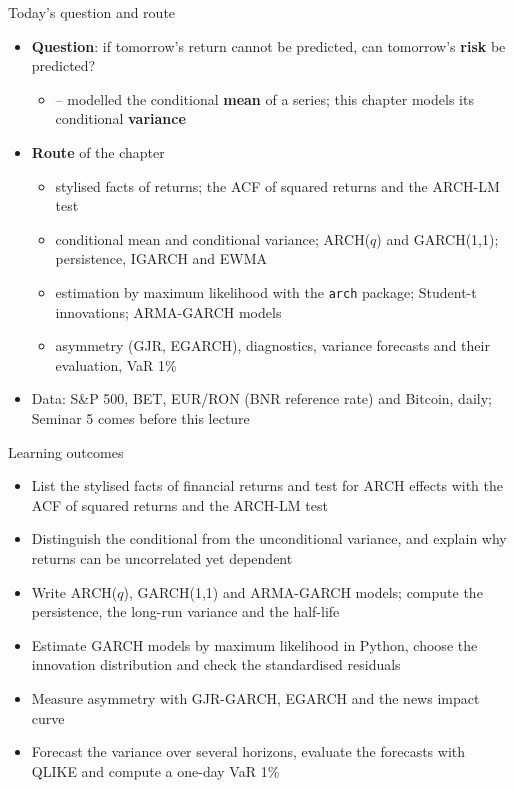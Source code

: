 \begin{frame}{Today's question and route}
\itemsize{\small}
\begin{itemize}
    \item \textbf{Question}: if tomorrow's return cannot be predicted, can tomorrow's \textbf{risk} be predicted?
    \begin{itemize}
        \item {}-- modelled the conditional \textbf{mean} of a series; this chapter models its conditional \textbf{variance}
    \end{itemize}
    \item \textbf{Route} of the chapter
    \begin{itemize}
        \item stylised facts of returns; the ACF of squared returns and the ARCH-LM test
        \item conditional mean and conditional variance; ARCH($q$) and GARCH(1,1); persistence, IGARCH and EWMA
        \item estimation by maximum likelihood with the \texttt{arch} package; Student-t innovations; ARMA-GARCH models
        \item asymmetry (GJR, EGARCH), diagnostics, variance forecasts and their evaluation, VaR 1\%
    \end{itemize}
    \item Data: S\&P 500, BET, EUR/RON (BNR reference rate) and Bitcoin, daily; Seminar 5 comes before this lecture
\end{itemize}
\end{frame}

\begin{frame}{Learning outcomes}
\itemsize{\small}
\begin{itemize}
    \item List the stylised facts of financial returns and test for ARCH effects with the ACF of squared returns and the ARCH-LM test
    \item Distinguish the conditional from the unconditional variance, and explain why returns can be uncorrelated yet dependent
    \item Write ARCH($q$), GARCH(1,1) and ARMA-GARCH models; compute the persistence, the long-run variance and the half-life
    \item Estimate GARCH models by maximum likelihood in Python, choose the innovation distribution and check the standardised residuals
    \item Measure asymmetry with GJR-GARCH, EGARCH and the news impact curve
    \item Forecast the variance over several horizons, evaluate the forecasts with QLIKE and compute a one-day VaR 1\%
\end{itemize}
\end{frame}

